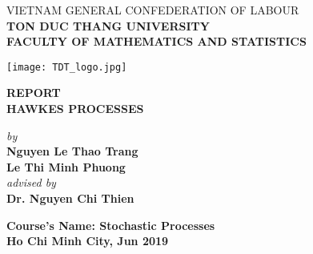 \begin{center}
	\large{VIETNAM GENERAL CONFEDERATION OF LABOUR} \\
	\large{\textbf{TON DUC THANG UNIVERSITY}} \\
	\large{\textbf{FACULTY OF MATHEMATICS AND STATISTICS}} \\
	\vspace*{1.5cm}

	\texttt{[image: TDT\_logo.jpg]} \\
	\vspace*{2cm}

	\huge{\textbf{REPORT}} \\ 
	\Huge{\textbf{HAWKES PROCESSES}}\\
	\vspace*{1.5cm}

	\LARGE{\textit{by}} \\
	\LARGE{\textbf{Nguyen Le Thao Trang}} \\
	\LARGE{\textbf{Le Thi Minh Phuong}} \\
	\LARGE{\textit{advised by}} \\
	\LARGE{\textbf{Dr. Nguyen Chi Thien}} \\
	\vspace{2cm}

	\LARGE{\textbf{Course’s Name: Stochastic Processes}} \\

	\large{\textbf{Ho Chi Minh City, Jun 2019}}
	
\end{center}

